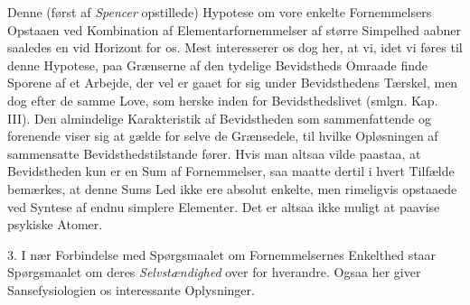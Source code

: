 \documentclass[12pt,a4paper,openany]{book}
\newcommand{\opage}[1]{\marginnote{\footnotesize\textit{[#1]}}}
\begin{document}
Denne (først af \emph{Spencer} opstillede) Hypotese om vore enkelte
Fornemmelsers Opstaaen ved Kombination af Elementarfornemmelser af
større Simpelhed aabner saaledes en vid Horizont for os. Mest
interesserer os dog her, at vi, idet vi føres til denne Hypotese, paa
Grænserne af den tydelige Bevidstheds Omraade finde Sporene af et
Arbejde, der vel er gaaet for sig under Bevidsthedens Tærskel, men dog
efter de samme Love, som herske inden for Bevidsthedslivet (smlgn. Kap.
III). Den almindelige Karakteristik af Bevidstheden som sammenfattende
og forenende viser sig at gælde for selve de Grænsedele, til hvilke
Opløsningen af sammensatte Bevidsthedstilstande fører. Hvis man altsaa
vilde paastaa, at Bevidstheden kun er en Sum af Fornemmelser, saa maatte
dertil i hvert Tilfælde bemærkes, at
\opage{128}denne Sums Led ikke ere absolut enkelte, men rimeligvis
opstaaede ved Syntese af endnu simplere Elementer. Det er altsaa ikke
muligt at paavise psykiske Atomer.

3. I nær Forbindelse med Spørgsmaalet om Fornemmelsernes Enkelthed staar
Spørgsmaalet om deres \emph{Selvstændighed} over for hverandre. Ogsaa
her giver Sansefysiologien os interessante Oplysninger.
\end{document}
